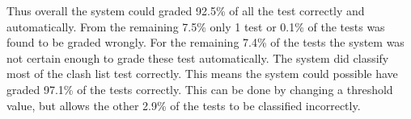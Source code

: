 Thus overall the system could graded 92.5\% of all the test correctly and automatically. From the remaining 7.5\% only 1 test or 0.1\% of the tests was found to be graded wrongly. For the remaining 7.4\% of the tests the system was not certain enough to grade these test automatically. The system did classify most of the clash list test correctly. This means the system could possible have graded 97.1\% of the tests correctly. This can be done by changing a threshold value, but allows the other 2.9\% of the tests to be classified incorrectly.

